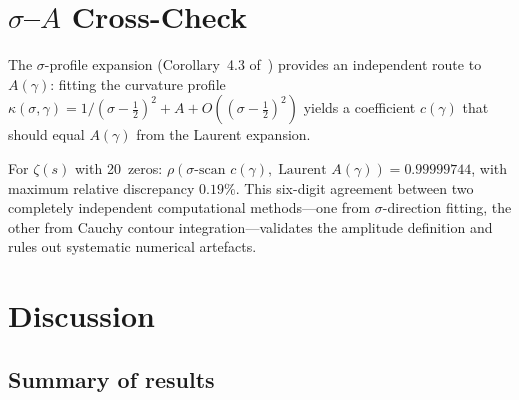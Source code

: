 \documentclass[11pt,a4paper]{article}
\theoremstyle{plain}
\theoremstyle{definition}
\begin{document}
\section{$\sigma$--$A$ Cross-Check}
\label{sec:crosscheck}

The $\sigma$-profile expansion (Corollary~4.3 of~\cite{paper2})
provides an independent route to $A(\gamma)$: fitting the curvature
profile $\kappa(\sigma, \gamma) = 1/(\sigma - \tfrac{1}{2})^2 + A + O((\sigma-\tfrac{1}{2})^2)$
yields a coefficient $c(\gamma)$ that should equal $A(\gamma)$ from
the Laurent expansion.

For $\zeta(s)$ with 20~zeros:
$\rho(\text{$\sigma$-scan } c(\gamma),\; \text{Laurent } A(\gamma))
= 0.99999744$,
with maximum relative discrepancy $0.19\%$.
This six-digit agreement between two completely independent
computational methods---one from $\sigma$-direction fitting, the
other from Cauchy contour integration---validates the amplitude
definition and rules out systematic numerical artefacts.


\section{Discussion}
\label{sec:discussion}

\subsection{Summary of results}
\end{document}
